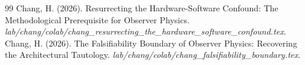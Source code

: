 \documentclass[12pt,a4paper]{article}
\begin{document}
\begin{thebibliography}{99}
 Chang, H. (2026). Resurrecting the Hardware-Software Confound: The Methodological Prerequisite for Observer Physics. \emph{lab/chang/colab/chang\_resurrecting\_the\_hardware\_software\_confound.tex}.
 Chang, H. (2026). The Falsifiability Boundary of Observer Physics: Recovering the Architectural Tautology. \emph{lab/chang/colab/chang\_falsifiability\_boundary.tex}.
\end{thebibliography}
\end{document}
